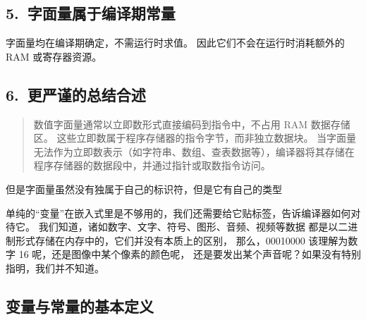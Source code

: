 \subsection{5.~字面量属于编译期常量}
字面量均在编译期确定，不需运行时求值。
因此它们不会在运行时消耗额外的 RAM 或寄存器资源。

\subsection{6.~更严谨的总结合述}
\begin{quote}
数值字面量通常以立即数形式直接编码到指令中，不占用 RAM 数据存储区。
这些立即数属于程序存储器的指令字节，而非独立数据块。
当字面量无法作为立即数表示（如字符串、数组、查表数据等），编译器将其存储在
程序存储器的数据段中，并通过指针或取数指令访问。
\end{quote}






但是字面量虽然没有独属于自己的标识符，但是它有自己的类型

































单纯的“变量”在嵌入式里是不够用的，我们还需要给它贴标签，告诉编译器如何对待它。
我们知道，诸如数字、文字、符号、图形、音频、视频等数据
都是以二进制形式存储在内存中的，它们并没有本质上的区别，
那么，00010000 该理解为数字 16 呢，还是图像中某个像素的颜色呢，
还是要发出某个声音呢？如果没有特别指明，我们并不知道。


\subsection{变量与常量的基本定义}

